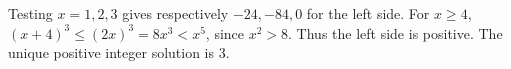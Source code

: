 Testing $x=1,2,3$ gives respectively $-24,-84,0$ for the left side. For $x\ge 4$, $(x+4)^3\le(2x)^3=8x^3<x^5$, since $x^2>8$. Thus the left side is positive. The unique positive integer solution is $\boxed 3$.
